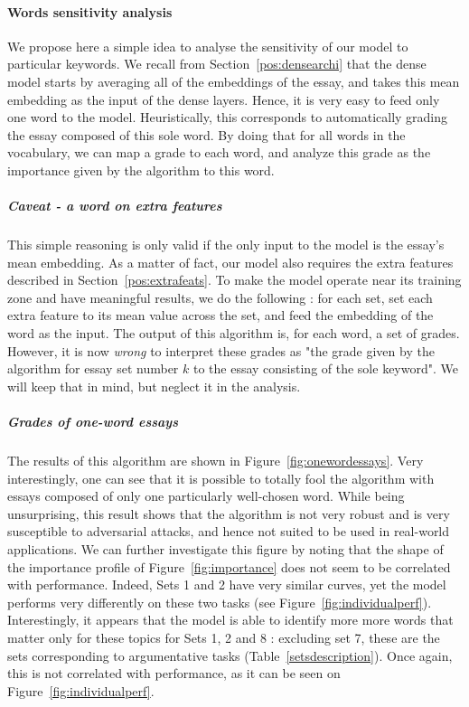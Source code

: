 \documentclass[a4paper,12pt,english]{article}
\begin{document}
\paragraph{Words sensitivity analysis} We propose here a simple idea to analyse the sensitivity of our model to particular keywords. We recall from Section~\ref{pos:densearchi} that the dense model starts by averaging all of the embeddings of the essay, and takes this mean embedding as the input of the dense layers. Hence, it is very easy to feed only one word to the model. Heuristically, this corresponds to automatically grading the essay composed of this sole word. By doing that for all words in the vocabulary, we can map a grade to each word, and analyze this grade as the importance given by the algorithm to this word.
\subparagraph{Caveat - a word on extra features} This simple reasoning is only valid if the only input to the model is the essay's mean embedding. As a matter of fact, our model also requires the extra features described in Section~\ref{pos:extrafeats}. To make the model operate near its training zone and have meaningful results, we do the following : for each set, set each extra feature to its mean value across the set, and feed the embedding of the word as the input. The output of this algorithm is, for each word, a set of grades. However, it is now \emph{wrong} to interpret these grades as "the grade given by the algorithm for essay set number $k$ to the essay consisting of the sole keyword". We will keep that in mind, but neglect it in the analysis.
\subparagraph{Grades of one-word essays} The results of this algorithm are shown in Figure~\ref{fig:onewordessays}. Very interestingly, one can see that it is possible to totally fool the algorithm with essays composed of only one particularly well-chosen word. While being unsurprising, this result shows that the algorithm is not very robust and is very susceptible to adversarial attacks, and hence not suited to be used in real-world applications.\newline
We can further investigate this figure by noting that the shape of the importance profile of Figure~\ref{fig:importance} does not seem to be correlated with performance. Indeed, Sets 1 and 2 have very similar curves, yet the model performs very differently on these two tasks (see Figure~\ref{fig:individualperf}). \newline
Interestingly, it appears that the model is able to identify more more words that matter only for these topics for Sets 1, 2 and 8 : excluding set 7, these are the sets corresponding to argumentative tasks (Table~\ref{setsdescription}). Once again, this is not correlated with performance, as it can be seen on Figure~\ref{fig:individualperf}.
\end{document}
